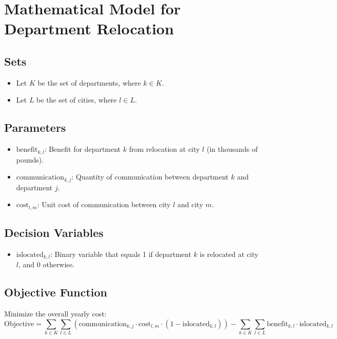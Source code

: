 \documentclass{article}
\begin{document}
\section*{Mathematical Model for Department Relocation}

\subsection*{Sets}
\begin{itemize}
    \item Let \( K \) be the set of departments, where \( k \in K \).
    \item Let \( L \) be the set of cities, where \( l \in L \).
\end{itemize}

\subsection*{Parameters}
\begin{itemize}
    \item \( \text{benefit}_{k,l} \): Benefit for department \( k \) from relocation at city \( l \) (in thousands of pounds).
    \item \( \text{communication}_{k,j} \): Quantity of communication between department \( k \) and department \( j \).
    \item \( \text{cost}_{l,m} \): Unit cost of communication between city \( l \) and city \( m \).
\end{itemize}

\subsection*{Decision Variables}
\begin{itemize}
    \item \( \text{islocated}_{k,l} \): Binary variable that equals 1 if department \( k \) is relocated at city \( l \), and 0 otherwise.
\end{itemize}

\subsection*{Objective Function}
Minimize the overall yearly cost:
\[
\text{Objective} = \sum_{k \in K} \sum_{l \in L} \left( \text{communication}_{k,j} \cdot \text{cost}_{l,m} \cdot (1 - \text{islocated}_{k,l}) \right) - \sum_{k \in K} \sum_{l \in L} \text{benefit}_{k,l} \cdot \text{islocated}_{k,l}
\]
\end{document}
